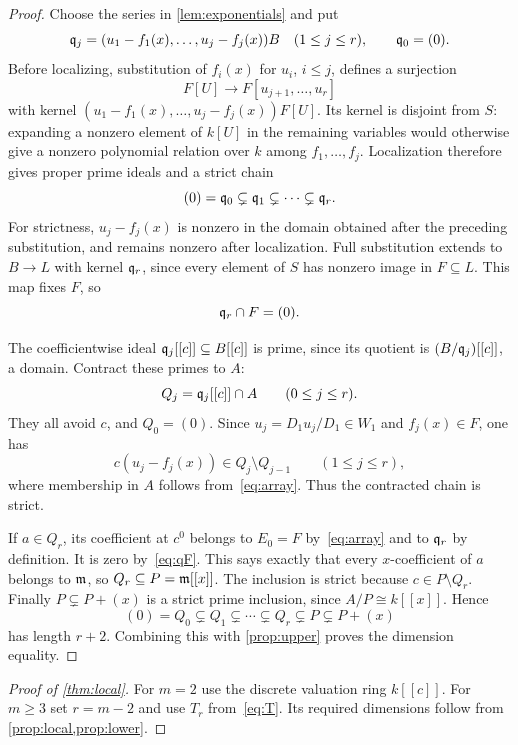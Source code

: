 \begin{proof}
Choose the series in \cref{lem:exponentials} and put
\[
 \mathfrak q_j=(u_1-f_1(x),\ldots,u_j-f_j(x))B\quad(1\le j\le r),
 \qquad\mathfrak q_0=(0).
\]
Before localizing, substitution of $f_i(x)$ for $u_i$, $i\le j$,
defines a surjection
\[
 F[U]\longrightarrow F[u_{j+1},\ldots,u_r]
\]
with kernel $(u_1-f_1(x),\ldots,u_j-f_j(x))F[U]$.
Its kernel is disjoint from $S$: expanding a nonzero element of
$k[U]$ in the remaining variables would otherwise give a nonzero
polynomial relation over $k$ among $f_1,\ldots,f_j$.
Localization therefore gives proper prime ideals and a strict chain
\begin{equation}\label{eq:qchain}
 (0)=\mathfrak q_0\subsetneq\mathfrak q_1\subsetneq\cdots\subsetneq\mathfrak q_r.
\end{equation}
For strictness, $u_j-f_j(x)$ is nonzero in the domain obtained
after the preceding substitution, and remains nonzero after
localization. Full substitution extends to $B\longrightarrow L$
with kernel $\mathfrak q_r$, since every element of $S$ has nonzero image
in $F\subseteq L$. This map fixes $F$, so
\begin{equation}\label{eq:qF}
 \mathfrak q_r\cap F=(0).
\end{equation}

The coefficientwise ideal $\mathfrak q_j[[c]]\subseteq B[[c]]$ is prime,
since its quotient is $(B/\mathfrak q_j)[[c]]$, a domain.
Contract these primes to $A$:
\[
 Q_j=\mathfrak q_j[[c]]\cap A\qquad(0\le j\le r).
\]
They all avoid $c$, and $Q_0=(0)$.
Since $u_j=D_1u_j/D_1\in W_1$ and $f_j(x)\in F$, one has
\[
 c(u_j-f_j(x))\in Q_j\setminus Q_{j-1}
 \qquad(1\le j\le r),
\]
where membership in $A$ follows from~\eqref{eq:array}.
Thus the contracted chain is strict.

If $a\in Q_r$, its coefficient at $c^0$ belongs to $E_0=F$
by~\eqref{eq:array} and to $\mathfrak q_r$ by definition. It is zero
by~\eqref{eq:qF}. This says exactly that every $x$-coefficient
of $a$ belongs to $\mathfrak m$, so $Q_r\subseteq P=\mathfrak m[[x]]$.
The inclusion is strict because $c\in P\setminus Q_r$.
Finally $P\subsetneq P+(x)$ is a strict prime inclusion, since
$A/P\cong k[[x]]$. Hence
\begin{equation}\label{eq:final-chain}
 (0)=Q_0\subsetneq Q_1\subsetneq\cdots\subsetneq Q_r
       \subsetneq P\subsetneq P+(x)
\end{equation}
has length $r+2$. Combining this with \cref{prop:upper} proves
the dimension equality.
\end{proof}

\begin{proof}[Proof of \cref{thm:local}]
For $m=2$ use the discrete valuation ring $k[[c]]$.
For $m\ge3$ set $r=m-2$ and use $T_r$ from~\eqref{eq:T}.
Its required dimensions follow from \cref{prop:local,prop:lower}.
\end{proof}
